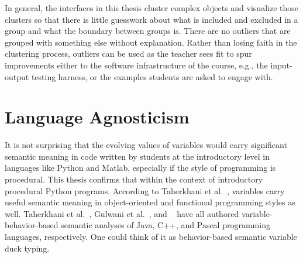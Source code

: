 
In general, the interfaces in this thesis cluster complex objects and visualize those clusters so that there is little guesswork about what is included and excluded in a group and what the boundary between groups is. There are no outliers that are grouped with something else without explanation. Rather than losing faith in the clustering process, outliers can be used as the teacher sees fit to spur improvements either to the software infrastructure of the course, e.g., the input-output testing harness, or the examples students are asked to engage with. 





\section{Language Agnosticism}

It is not surprising that the evolving values of variables would carry significant semantic meaning in code written by students at the introductory level in languages like Python and Matlab, especially if the style of programming is procedural. This thesis confirms that within the context of introductory procedural Python programs. According to Taherkhani et al.~\cite{taherkhani2010recognizing}, variables carry useful semantic meaning in object-oriented and functional programming styles as well. Taherkhani et al.~\cite{}, Gulwani et al.~\cite{gulwani_fse14}, and ~\cite{sajaniemi2002empirical} have all authored variable-behavior-based semantic analyses of Java, C++, and Pascal programming languages, respectively. One could think of it as behavior-based semantic variable duck typing. 

